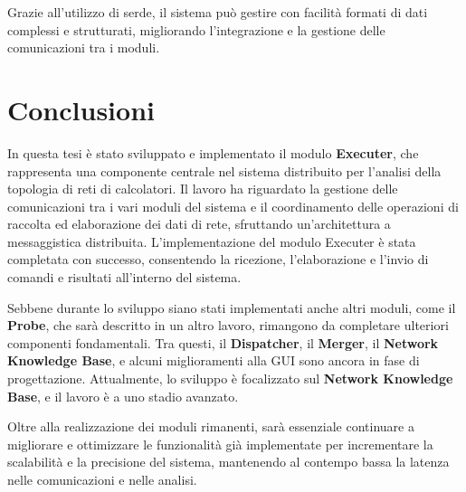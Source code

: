 \documentclass[target=bach,aauheader=,style=]{thud}
\begin{document}
Grazie all'utilizzo di serde, il sistema può gestire con facilità formati di dati complessi e strutturati, migliorando l'integrazione e la gestione delle comunicazioni tra i moduli.



\chapter{Conclusioni}
In questa tesi è stato sviluppato e implementato il modulo \textbf{Executer}, che rappresenta una componente centrale nel sistema distribuito per l'analisi della topologia di reti di calcolatori. Il lavoro ha riguardato la gestione delle comunicazioni tra i vari moduli del sistema e il coordinamento delle operazioni di raccolta ed elaborazione dei dati di rete, sfruttando un'architettura a messaggistica distribuita. L'implementazione del modulo Executer è stata completata con successo, consentendo la ricezione, l'elaborazione e l'invio di comandi e risultati all'interno del sistema.

Sebbene durante lo sviluppo siano stati implementati anche altri moduli, come il \textbf{Probe}, che sarà descritto in un altro lavoro, rimangono da completare ulteriori componenti fondamentali. Tra questi, il \textbf{Dispatcher}, il \textbf{Merger}, il \textbf{Network Knowledge Base}, e alcuni miglioramenti alla GUI sono ancora in fase di progettazione. Attualmente, lo sviluppo è focalizzato sul \textbf{Network Knowledge Base}, e il lavoro è a uno stadio avanzato.

Oltre alla realizzazione dei moduli rimanenti, sarà essenziale continuare a migliorare e ottimizzare le funzionalità già implementate per incrementare la scalabilità e la precisione del sistema, mantenendo al contempo bassa la latenza nelle comunicazioni e nelle analisi.



\end{document}
